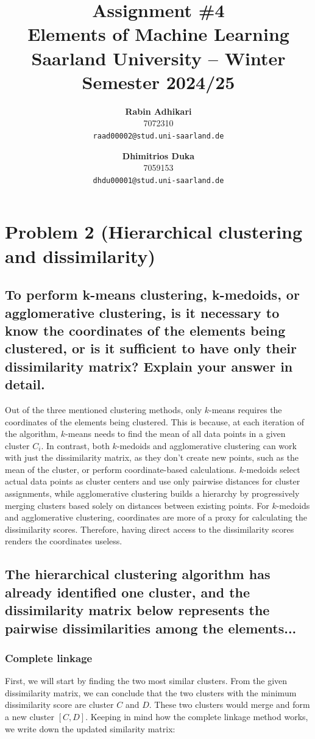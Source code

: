\documentclass{article}
\title{Assignment \#4\\
  \vspace{2mm}
  \small{Elements of Machine Learning}
  \\
  \vspace{2mm}
  \small{Saarland University -- Winter Semester 2024/25}
}
\author{%
\textbf{Rabin Adhikari} \\
  7072310 \\
  \texttt{raad00002@stud.uni-saarland.de} \\
  \and
  \textbf{Dhimitrios Duka} \\
 7059153 \\
  \texttt{dhdu00001@stud.uni-saarland.de} \\
}
\begin{document}
\maketitle

\setcounter{section}{1}
\section{Problem 2 (Hierarchical clustering and dissimilarity)}
\subsection{To perform k-means clustering, k-medoids, or agglomerative clustering, is it necessary to know the coordinates of the elements being clustered, or is it sufficient to have only their dissimilarity matrix? Explain your answer in detail.}
Out of the three mentioned clustering methods, only $k$-means requires the coordinates of the elements being clustered. This is because, at each iteration of the algorithm, $k$-means needs to find the mean of all data points in a given cluster $C_i$. In contrast, both $k$-medoids and agglomerative clustering can work with just the dissimilarity matrix, as they don't create new points, such as the mean of the cluster, or perform coordinate-based calculations. $k$-medoids select actual data points as cluster centers and use only pairwise distances for cluster assignments, while agglomerative clustering builds a hierarchy by progressively merging clusters based solely on distances between existing points. For $k$-medoids and agglomerative clustering, coordinates are more of a proxy for calculating the dissimilarity scores. Therefore, having direct access to the dissimilarity scores renders the coordinates useless.

\subsection{The hierarchical clustering algorithm has already identified one cluster, and the dissimilarity matrix below represents the pairwise dissimilarities among the elements...}
\subsubsection{Complete linkage}
First, we will start by finding the two most similar clusters. From the given dissimilarity matrix, we can conclude that the two clusters with the minimum dissimilarity score are cluster $C$ and $D$. These two clusters would merge and form a new cluster $[C, D]$. Keeping in mind how the complete linkage method works, we write down the updated similarity matrix:
\end{document}
